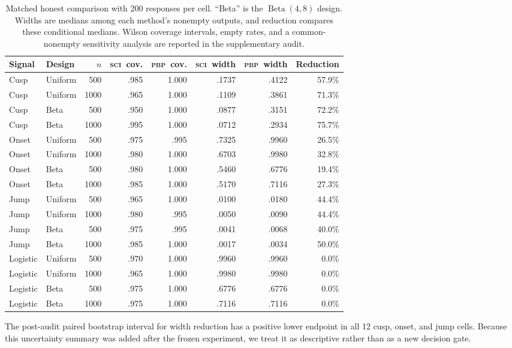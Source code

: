 \documentclass{interact}
\theoremstyle{definition}
\theoremstyle{remark}
\newcommand{\SCI}{\textnormal{\textsc{sci}}\xspace}
\newcommand{\PBP}{\textnormal{\textsc{pbp}}\xspace}
\begin{document}
\begin{table}[htbp]
\centering
\caption{Matched honest comparison with 200 responses per cell.  ``Beta'' is
the $\operatorname{Beta}(4,8)$ design.  Widths are medians among each method's
nonempty outputs, and reduction compares these conditional medians.  Wilson
coverage intervals, empty rates, and a common-nonempty sensitivity analysis
are reported in the supplementary audit.}
\label{tab:e38}
\scriptsize
\setlength{\tabcolsep}{4.2pt}
\begin{tabular}{llrrrrrr}
\toprule
Signal & Design & $n$ & \SCI\ cov. & \PBP\ cov. & \SCI\ width & \PBP\ width & Reduction\\
\midrule
Cusp & Uniform & 500  & .985 & 1.000 & .1737 & .4122 & 57.9\%\\
Cusp & Uniform & 1000 & .965 & 1.000 & .1109 & .3861 & 71.3\%\\
Cusp & Beta    & 500  & .950 & 1.000 & .0877 & .3151 & 72.2\%\\
Cusp & Beta    & 1000 & .995 & 1.000 & .0712 & .2934 & 75.7\%\\
Onset & Uniform & 500  & .975 & .995 & .7325 & .9960 & 26.5\%\\
Onset & Uniform & 1000 & .980 & 1.000 & .6703 & .9980 & 32.8\%\\
Onset & Beta    & 500  & .980 & 1.000 & .5460 & .6776 & 19.4\%\\
Onset & Beta    & 1000 & .985 & 1.000 & .5170 & .7116 & 27.3\%\\
Jump & Uniform & 500  & .965 & 1.000 & .0100 & .0180 & 44.4\%\\
Jump & Uniform & 1000 & .980 & .995 & .0050 & .0090 & 44.4\%\\
Jump & Beta    & 500  & .975 & .995 & .0041 & .0068 & 40.0\%\\
Jump & Beta    & 1000 & .985 & 1.000 & .0017 & .0034 & 50.0\%\\
Logistic & Uniform & 500  & .970 & 1.000 & .9960 & .9960 & 0.0\%\\
Logistic & Uniform & 1000 & .965 & 1.000 & .9980 & .9980 & 0.0\%\\
Logistic & Beta    & 500  & .975 & 1.000 & .6776 & .6776 & 0.0\%\\
Logistic & Beta    & 1000 & .975 & 1.000 & .7116 & .7116 & 0.0\%\\
\bottomrule
\end{tabular}
\end{table}

The post-audit paired bootstrap interval for width reduction has a positive
lower endpoint in all 12 cusp, onset, and jump cells.  Because this uncertainty
summary was added after the frozen experiment, we treat it as descriptive
rather than as a new decision gate.
\end{document}
